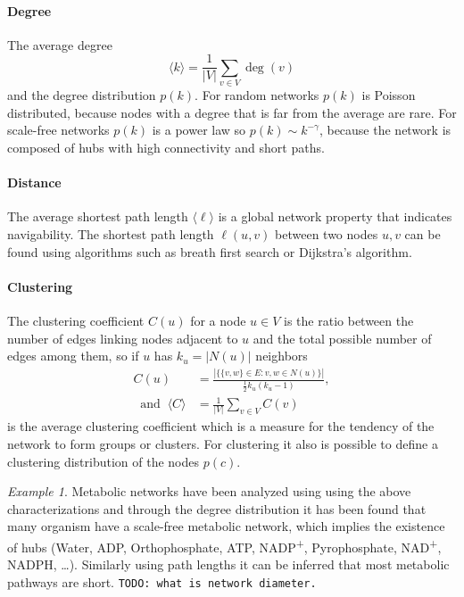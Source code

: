 \documentclass[a4paper]{article}
\newcommand{\todo}[1]{\texttt{TODO: #1}}
\theoremstyle{plain}
\theoremstyle{definition}
\theoremstyle{remark}
\newtheorem*{example}{Example}
\begin{document}
\paragraph{Degree} The average degree
\[
  \langle k \rangle = \frac{1}{|V|} \sum_{v \in V} \deg(v)
\]
and the degree distribution $p(k)$. For random networks $p(k)$ is Poisson
distributed, because nodes with a degree that is far from the average are
rare. For scale-free networks $p(k)$ is a power law so $p(k) \sim
k^{-\gamma}$, because the network is composed of hubs with high connectivity
and short paths.

\paragraph{Distance} The average shortest path length $\langle \ell \rangle$
is a global network property that indicates navigability. The shortest path
length $\ell(u,v)$ between two nodes $u,v$ can be found using algorithms such
as breath first search or Dijkstra's algorithm.

\paragraph{Clustering} The clustering coefficient $C(u)$ for a node $u \in V$
is the ratio between the number of edges linking nodes adjacent to $u$
and the total possible number of edges among them, so if $u$ has $k_u =
|N(u)|$ neighbors
\begin{align*}
  C(u) &= \frac{|\{\{v,w\} \in E : v,w \in N(u)\}|}{\frac{1}{2} k_u(k_u - 1)}, \\
  ~\text{ and }~
  \langle C \rangle &= \frac{1}{|V|} \sum_{v \in V} C(v)
\end{align*}
is the average clustering coefficient which is a measure for the tendency of
the network to form groups or clusters. For clustering it also is possible to
define a clustering distribution of the nodes $p(c)$.

\begin{example}
  Metabolic networks have been analyzed using using the above
  characterizations and through the degree distribution it has been found that
  many organism have a scale-free metabolic network, which implies the
  existence of hubs (Water, ADP, Orthophosphate, ATP, NADP\textsuperscript{+},
  Pyrophosphate, NAD\textsuperscript{+}, NADPH, \ldots). Similarly using path
  lengths it can be inferred that most metabolic pathways are short.
  \todo{what is network diameter.}
\end{example}
\end{document}
